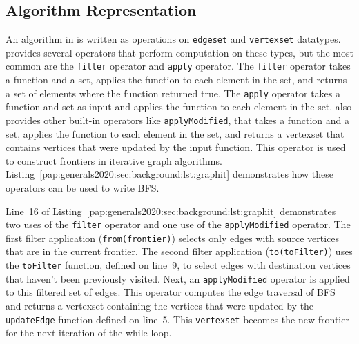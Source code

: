 \subsection{Algorithm Representation}
An algorithm in \graphit is written as operations on \lstinline[language=graphit]{edgeset} and \lstinline[language=graphit]{vertexset} datatypes. 
\graphit provides several operators that perform computation on these types, but the most common are the \lstinline[language=graphit]{filter} operator and \lstinline[language=graphit]{apply} operator.
The \lstinline[language=graphit]{filter} operator takes a function and a set, applies the function to each element in the set, and returns a set of elements where the function returned true.
The \lstinline[language=graphit]{apply} operator takes a function and set as input and applies the function to each element in the set. %
\graphit also provides other built-in operators like \lstinline[language=graphit]{applyModified}, that takes a function and a set, applies the function to each element in the set, and returns a vertexset that contains vertices that were updated by the input function. 
This operator is used to construct frontiers in iterative graph algorithms. 
Listing~\ref{pap:generals2020:sec:background:lst:graphit} demonstrates how these operators can be used to write BFS.

Line~16 of Listing~\ref{pap:generals2020:sec:background:lst:graphit} demonstrates two uses of the \lstinline[language=graphit]{filter} operator and one use of the \lstinline[language=graphit]{applyModified} operator. 
The first filter application (\lstinline[language=graphit]{from(frontier)}) selects only edges with source vertices that are in the current frontier. 
The second filter application (\lstinline[language=graphit]{to(toFilter)}) uses the \lstinline[language=graphit]{toFilter} function, defined on line~9, to select edges with destination vertices that haven't been previously visited.
Next, an \lstinline[language=graphit]{applyModified} operator is applied to this filtered set of edges.
This operator computes the edge traversal of BFS and returns a vertexset containing the vertices that were updated by the \lstinline[language=graphit]{updateEdge} function defined on line~5.
This \lstinline[language=graphit]{vertexset} becomes the new frontier for the next iteration of the while-loop.

